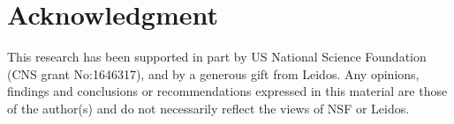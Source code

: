 \documentclass[conference]{IEEEtran}
\begin{document}


\section*{Acknowledgment}

This research has been supported in part by US National Science Foundation
 (CNS grant No:1646317), and by a generous gift from Leidos. Any opinions, findings and conclusions or recommendations expressed in this material are those of the author(s) and do not necessarily reflect the views of NSF or Leidos.







%
%
%

%
%






\end{document}
